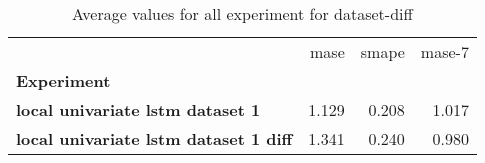 \begin{table}[h]
\centering
\caption{Average values for all experiment for dataset-diff}
\label{table:Average-metric-dataset-diff}
\begin{tabular}{lrrr}
\toprule
{} &   mase &  smape &  mase-7 \\
\textbf{Experiment                          } &        &        &         \\
\midrule
\textbf{local univariate lstm dataset 1     } &  1.129 &  0.208 &   1.017 \\
\textbf{local univariate lstm dataset 1 diff} &  1.341 &  0.240 &   0.980 \\
\bottomrule
\end{tabular}
\end{table}
